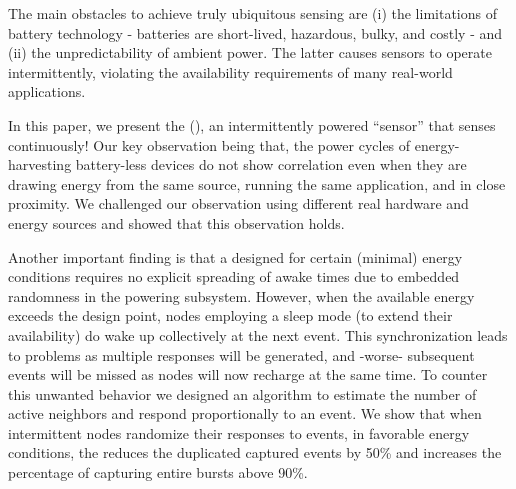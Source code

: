 The main obstacles to achieve truly ubiquitous sensing are (i) the limitations of battery technology - batteries are short-lived, hazardous, bulky, and costly - and (ii) the unpredictability of ambient power. The latter causes sensors to operate intermittently, violating the availability requirements of many real-world applications. 

In this paper, we present the \textit{\fullcis} (\cis), an intermittently powered ``sensor'' that senses continuously!
Our key observation being that, the power cycles of energy-harvesting battery-less devices do not show correlation even when they are drawing energy from the same source, running the same application, and in close proximity.
We challenged our observation using different real hardware and energy sources and showed that this observation holds.

Another important finding is that a \cis designed for certain (minimal) energy conditions requires no explicit spreading of awake times due to embedded randomness in the powering subsystem. However, when the available energy exceeds the design point, nodes employing a sleep mode (to extend their availability) do wake up collectively at the next event. This synchronization leads to problems as multiple responses will be generated, and -worse- subsequent events will be missed as nodes will now recharge at the same time.
To counter this unwanted behavior we designed an algorithm to estimate the number of active neighbors and respond proportionally to an event. 
We show that when intermittent nodes randomize their responses to events, in favorable energy conditions, the \cis reduces the duplicated captured events by 50\% and increases the percentage of capturing entire bursts above 90\%. 
